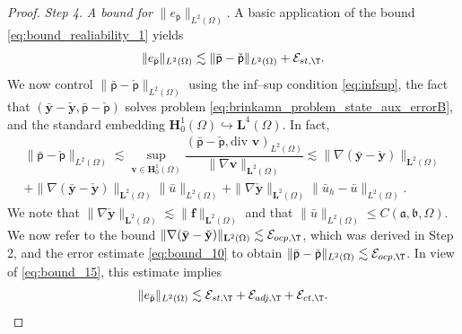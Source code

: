 \documentclass[final]{siamart0216}
\begin{document}
\begin{proof}
\emph{Step 4.} \emph{A bound for} $\|e_{\bar{\mathsf{p}}}\|_{L^2(\Omega)}$. A basic application of the bound \eqref{eq:bound_realiability_1} yields
\begin{align}\label{eq:bound_15}
\|e_{\bar{\mathsf{p}}}\|_{L^2(\Omega)}\lesssim \|\bar{\mathsf{p}}-\check{\mathsf{p}}\|_{L^2(\Omega)}+\mathcal{E}_{st,\T}.
\end{align}
We now control $\|\bar{\mathsf{p}}-\check{\mathsf{p}}\|_{L^2(\Omega)}$ using the inf--sup condition \eqref{eq:infsup}, the fact that $(\bar{\mathbf{y}}-\check{\mathbf{y}},\bar{\mathsf{p}}-\check{\mathsf{p}})$ solves problem \eqref{eq:brinkamn_problem_state_aux_errorB}, and the standard embedding $\mathbf{H}_0^1(\Omega) \hookrightarrow \mathbf{L}^4(\Omega)$. In fact,
\begin{multline}\label{eq:infsup_state_aux}
\|\bar{\mathsf{p}}-\check{\mathsf{p}}\|_{L^2(\Omega)}\lesssim \sup_{\mathbf{v}\in \mathbf{H}_0^1(\Omega)}\dfrac{(\bar{\mathsf{p}}-\check{\mathsf{p}},\text{div }\mathbf{v})_{L^2(\Omega)}}{\|\nabla \mathbf{v}\|_{\mathbf{L}^2(\Omega)}}\lesssim \|\nabla (\bar{\mathbf{y}}-\check{\mathbf{y}}) \|_{\mathbf{L}^2(\Omega)}\\
+\|\nabla (\bar{\mathbf{y}}-\check{\mathbf{y}}) \|_{\mathbf{L}^2(\Omega)} \|\bar{u}\|_{L^2(\Omega)}+\|\nabla \check{\mathbf{y}}\|_{\mathbf{L}^2(\Omega)}\|\bar{u}_{h}-\bar{u}\|_{L^2(\Omega)}.
\end{multline}
We note that $\|\nabla \check{\mathbf{y}}\|_{\mathbf{L}^2(\Omega)}\lesssim \| \mathbf{f}\|_{\mathbf{L}^2(\Omega)}$ and that $\| \bar{u} \|_{L^2(\Omega)} \leq C(\mathfrak{a},\mathfrak{b},\Omega)$. We now refer to the bound $\|\nabla (\bar{\mathbf{y}}-\check{\mathbf{y}})\|_{\mathbf{L}^2(\Omega)} \lesssim \mathcal{E}_{ocp,\T}$, which was derived in Step 2, and the error estimate \eqref{eq:bound_10} to obtain $\|\bar{\mathsf{p}}-\check{\mathsf{p}}\|_{L^2(\Omega)}\lesssim \mathcal{E}_{ocp,\T}$. In view of  \eqref{eq:bound_15}, this estimate implies 
\begin{align}\label{eq:bound_16}
\|e_{\bar{\mathsf{p}}}\|_{L^2(\Omega)}\lesssim \mathcal{E}_{st,\T}+\mathcal{E}_{adj,\T}+\mathcal{E}_{ct,\T}.
\end{align}


\end{proof}
\end{document}
